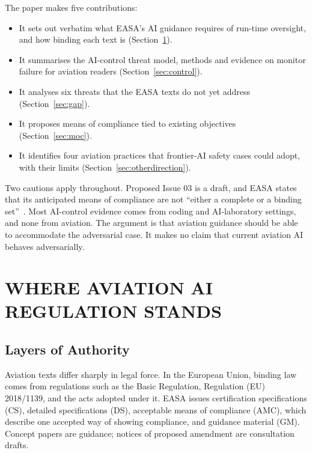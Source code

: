 \documentclass{aer}
\begin{document}
The paper makes five contributions:

\begin{itemize}
\item It sets out verbatim what EASA's AI guidance requires of run-time oversight, and how binding each text is (Section~\ref{sec:regulation}).
\item It summarises the AI-control threat model, methods and evidence on monitor failure for aviation readers (Section~\ref{sec:control}).
\item It analyses six threats that the EASA texts do not yet address (Section~\ref{sec:gap}).
\item It proposes means of compliance tied to existing objectives (Section~\ref{sec:moc}).
\item It identifies four aviation practices that frontier-AI safety cases could adopt, with their limits (Section~\ref{sec:otherdirection}).
\end{itemize}

Two cautions apply throughout. Proposed Issue 03 is a draft, and EASA states that its anticipated means of compliance are not ``either a complete or a binding set''~\citeyearpar[Section~B]{easa2026concept}. Most AI-control evidence comes from coding and AI-laboratory settings, and none from aviation. The argument is that aviation guidance should be able to accommodate the adversarial case. It makes no claim that current aviation AI behaves adversarially.

\section{WHERE AVIATION AI REGULATION STANDS}\label{sec:regulation}

\subsection{Layers of Authority}\label{sec:layers}

Aviation texts differ sharply in legal force. In the European Union, binding law comes from regulations such as the Basic Regulation, Regulation (EU) 2018/1139, and the acts adopted under it. EASA issues certification specifications (CS), detailed specifications (DS), acceptable means of compliance (AMC), which describe one accepted way of showing compliance, and guidance material (GM). Concept papers are guidance; notices of proposed amendment are consultation drafts.
\end{document}
